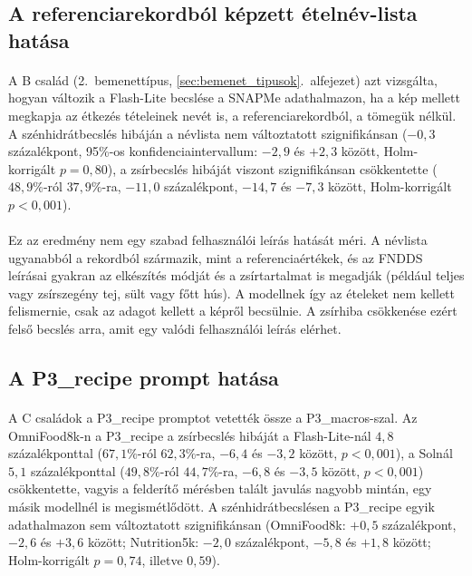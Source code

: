 \subsection{A referenciarekordból képzett ételnév-lista hatása}
\paragraph{}A B család (2.~bemenettípus, \ref{sec:bemenet_tipusok}.~alfejezet) azt vizsgálta, hogyan változik a Flash-Lite becslése a SNAPMe adathalmazon, ha a kép
mellett megkapja az étkezés tételeinek nevét is, a referenciarekordból, a tömegük nélkül. A szénhidrátbecslés
hibáján a névlista nem változtatott szignifikánsan ($-0{,}3$ százalékpont, 95\%-os konfidenciaintervallum: $-2{,}9$ és $+2{,}3$
között, Holm-korrigált $p = 0{,}80$), a zsírbecslés hibáját viszont szignifikánsan csökkentette ($48{,}9\%$-ról
$37{,}9\%$-ra, $-11{,}0$ százalékpont, $-14{,}7$ és $-7{,}3$ között, Holm-korrigált $p < 0{,}001$).
\paragraph{}Ez az eredmény nem egy szabad felhasználói leírás hatását méri. A névlista ugyanabból a rekordból
származik, mint a referenciaértékek, és az FNDDS leírásai gyakran az elkészítés módját és a zsírtartalmat is
megadják (például teljes vagy zsírszegény tej, sült vagy főtt hús). A modellnek így az ételeket nem kellett
felismernie, csak az adagot kellett a képről becsülnie. A zsírhiba csökkenése ezért felső becslés arra, amit egy
valódi felhasználói leírás elérhet.

\subsection{A P3\_recipe prompt hatása}
\paragraph{}A C családok a P3\_recipe promptot vetették össze a P3\_macros-szal. Az OmniFood8k-n a P3\_recipe a zsírbecslés hibáját 
a Flash-Lite-nál $4{,}8$ százalékponttal ($67{,}1\%$-ról $62{,}3\%$-ra, $-6{,}4$ és $-3{,}2$ között, $p < 0{,}001$), a Solnál $5{,}1$ százalékponttal
 ($49{,}8\%$-ról $44{,}7\%$-ra, $-6{,}8$ és $-3{,}5$ között, $p < 0{,}001$) csökkentette, vagyis a felderítő mérésben talált javulás nagyobb mintán, 
 egy másik modellnél is megismétlődött. A szénhidrátbecslésen a P3\_recipe egyik adathalmazon sem változtatott szignifikánsan 
 (OmniFood8k: $+0{,}5$ százalékpont, $-2{,}6$ és $+3{,}6$ között; Nutrition5k: $-2{,}0$ százalékpont, $-5{,}8$ és $+1{,}8$ között; 
 Holm-korrigált $p = 0{,}74$, illetve $0{,}59$).

